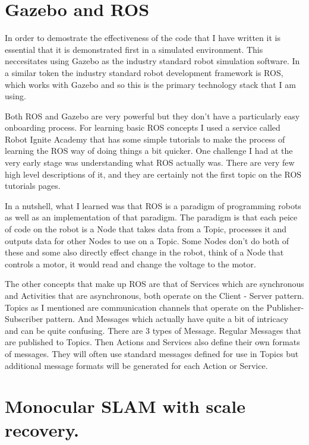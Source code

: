 \documentclass[]{../resources/final_report}
\begin{document}
\section{Gazebo and ROS}

In order to demostrate the effectiveness of the code that I have written it is essential that it is demonstrated first in a simulated environment.
This neccesitates using Gazebo as the industry standard robot simulation software. In a similar token the industry standard robot development framework is ROS, which works with Gazebo and so this is the primary technology stack that I am using.

Both ROS and Gazebo are very powerful but they don't have a particularly easy onboarding process. For learning basic ROS concepts I used a service called Robot Ignite Academy that has some simple tutorials to make the process of learning the ROS way of doing things a bit quicker.
One challenge I had at the very early stage was understanding what ROS actually was. There are very few high level descriptions of it, and they are certainly not the first topic on the ROS tutorials pages.

In a nutshell, what I learned was that ROS is a paradigm of programming robots as well as an implementation of that paradigm. The paradigm is that each peice of code on the robot is a Node that takes data from a Topic, processes it and outputs data for other Nodes to use on a Topic. 
Some Nodes don't do both of these and some also directly effect change in the robot, think of a Node that controls a motor, it would read and change the voltage to the motor.

The other concepts that make up ROS are that of Services which are synchronous and Activities that are asynchronous, both operate on the Client - Server pattern. Topics as I mentioned are communication channels that operate on the Publisher-Subscriber pattern. And Messages which actually have quite a bit of intricacy and can be quite confusing.
There are 3 types of Message. Regular Messages that are published to Topics. Then Actions and Services also define their own formats of messages. They will often use standard messages defined for use in Topics but additional message formats will be generated for each Action or Service.


\pagebreak
\section{Monocular SLAM with scale recovery.}
\end{document}
